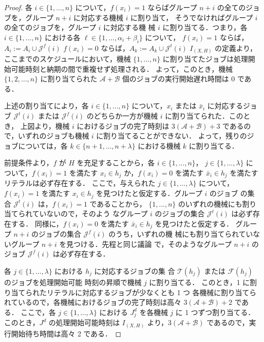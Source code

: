 \documentclass[12pt]{optlab-bachelor}
\begin{document}
\begin{proof}
  各 $i \in \{1,\ldots, n\}$ について，$f(x_i) = 1$ ならばグループ $n +
  i$ の全てのジョブを，グループ $n + i$ に対応する機械 $i$ に割り当て，
  そうでなければグループ $i$ の全てのジョブを，グループ $i$ に対応する機
  械 $i$ に割り当てる．つまり，各 $i \in \{1,\ldots, n\}$ における各
  $\ell \in \{1,\ldots,\alpha_i + \beta_i\}$ について，
  $f(x_i) = 1$ ならば，$A_i := A_i \cup \mathcal{J}^f(i)$
  $f(x_i) = 0$ ならば，$A_k := A_k \cup \mathcal{J}^t(i)$
  $I_{(X,H)}$ の定義より，ここまでのスケジュールにおいて，機械
  $\{1,\ldots, n\}$ に割り当てたジョブは処理開始可能時刻と納期の間で重複せず処理される．
  よって，このとき，機械 $\{1,2,\ldots,n\}$ に割り当てられた
  $\mathcal{A} + \mathcal{B}$ 個のジョブの実行開始遅れ時間は $0$ である．

  上述の割り当てにより，各 $i \in \{1,\ldots,n\}$ について，$x_i$ または
  $\bar x_i$ に対応するジョブ $\mathcal{J}^t(i)$ または
  $\mathcal{J}^f(i)$ のどちらか一方が機械 $i$ に割り当てられた．このとき，
  上図より，機械 $i$ におけるジョブの完了時刻は $3(\mathcal{A} +
  \mathcal{B}) + 3$ であるので，いずれのジョブも機械 $i$ に割り当てることができない．
  よって，残りのジョブについては，各 $k \in \{n + 1,\ldots,n +
  \lambda\}$ における機械 $k$ に割り当てる．

  前提条件より，$f$ が $H$ を充足することから，各 $i \in \{1,\ldots,n\}$，
  $j \in \{1, \ldots, \lambda \}$ について，$f(x_i) = 1$ を満たす $x_i
  \in h_j$ か，$f(x_i) = 0$ を満たす $\bar x_i \in h_j$ を満たすリテラルは必ず存在する．
  ここで，与えられた $j \in \{1, \ldots, \lambda \}$ について，$f(x_i) =
  1$ を満たす $x_i \in h_j$ を見つけたと仮定する．グループ $i$ のジョブ
  の集合 $\mathcal{J}^t(i)$ は，$f(x_i) = 1$ であることから，
  $\{1,\ldots,n\}$ のいずれの機械にも割り当てられていないので，そのよう
  なグループ $i$ のジョブの集合 $\mathcal{J}^t(i)$ は必ず存在する．
  同様に，$f(x_i) = 0$ を満たす $\bar x_i \in h_j$ を見つけたと仮定する．
  グループ $n + i$ のジョブの集合 $\mathcal{J}^f(i)$ のうち，いずれの機
  械にも割り当てられていないグループ $n + i$ を見つける．先程と同じ議論
  で，そのようなグループ $n + i$ のジョブ $\mathcal{J}^f(i)$ は必ず存在する．

  各 $j \in \{1, \ldots, \lambda \}$ における $h_j$ に対応するジョブの集
  合 $\mathcal{T}(h_j)$ または $\mathcal{F}(h_j)$ のジョブを処理開始可能
  時刻の昇順で機械 $j$ に割り当てる．
  このとき，1 に割り当てられたリテラルに対応するジョブが少なくとも 1 つ
  各機械に割り当てられているので，各機械におけるジョブの完了時刻は高々
  $3(\mathcal{A} + \mathcal{B}) + 2$ である．
  ここで，各 $j \in \{1,\ldots,\lambda\}$ における $J^d_j$ を各機械 $j$
  に 1 つずつ割り当てる．
  このとき，$J^d$ の処理開始可能時刻は $I_{(X,H)}$ より，$3(\mathcal{A}
  + \mathcal{B})$ であるので，実行開始待ち時間は高々 2 である．


\end{proof}
\end{document}
